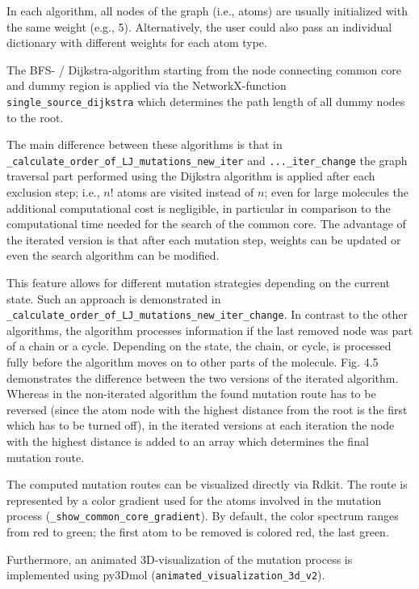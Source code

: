 In each algorithm, all nodes of the graph (i.e., atoms) are usually
initialized with the same weight (e.g., 5). Alternatively, the user
could also pass an individual dictionary with different weights for
each atom type.

The BFS- / Dijkstra-algorithm starting from the node connecting common
core and dummy region is applied via the NetworkX-function \texttt{single\_source\_dijkstra}
which determines the path length of all dummy nodes to the root.

The main difference between these algorithms is that in \texttt{\_calculate\_order\_of\_LJ\_mutations\_new\_iter}
and \texttt{...\_iter\_change} the graph traversal part performed
using the Dijkstra algorithm is applied after each exclusion step; i.e., $n!$ atoms are visited instead of $n$; even for large molecules the additional computational cost is negligible, in particular in comparison
to the computational time needed for the search of the common core.
The advantage of the iterated version is that after each mutation step, weights can be
updated or even the search algorithm can be modified. 

This feature allows for different mutation strategies depending
on the current state. Such an approach is demonstrated in \texttt{\_calculate\_order\_of\_LJ\_mutations\_new\_iter\_change}.
In contrast to the other algorithms, the algorithm processes information
if the last removed node was part of a chain or a cycle. Depending
on the state, the chain, or cycle, is processed fully before the algorithm
moves on to other parts of the molecule.  Fig. 4.5 demonstrates the difference between the two versions of the iterated algorithm.
Whereas in the non-iterated algorithm the found mutation route has to be reversed (since the atom node with the highest distance from the root is the first which has to be turned off), in the iterated versions at each iteration the node with the highest distance is added to an array which determines the final mutation route.

The computed mutation routes can be visualized directly via Rdkit. 
The route is represented by a color gradient used for the atoms involved
in the mutation process (\texttt{\_show\_common\_core\_gradient}). By default, the color spectrum ranges from red to green; the first atom to be removed is colored red, the last green.

Furthermore, an animated 3D-visualization of the mutation process
is implemented using py3Dmol (\texttt{animated\_visualization\_3d\_v2})\cite{key-4}. 

